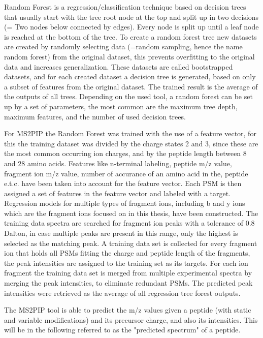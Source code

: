 \documentclass[11pt]{article}
\begin{document}
Random Forest \cite{random-forest} is a regression/classification technique based on decision trees that usually start with the tree root node at the top and split up in two decisions (= Two nodes below connected by edges). Every node is split up until a leaf node is reached at the bottom of the tree. To create a random forest tree new datasets are created by randomly selecting data (=random sampling, hence the name random forest) from the original dataset, this prevents overfitting to the original data and increases generalization. These datasets are called bootstrapped datasets, and for each created dataset a decision tree is generated, based on only a subset of features from the original dataset. The trained result is the average of the outputs of all trees. Depending on the used tool, a random forest can be set up by a set of parameters, the most common are the maximum tree depth, maximum features, and the number of used decision trees.

For MS2PIP the Random Forest was trained with the use of a feature vector, for this the training dataset was divided by the charge states 2 and 3, since these are the most common occurring ion charges, and by the peptide length between 8 and 28 amino acids. Features like n-terminal labeling, peptide m/z value, fragment ion m/z value, number of accurance of an amino acid in the, peptide e.t.c. have been taken into account for the feature vector. Each PSM is then assigned a set of features in the feature vector and labeled with a target. Regression models for multiple types of fragment ions, including b and y ions which are the fragment ions focused on in this thesis, have been constructed. The training data spectra are searched for fragment ion peaks with a tolerance of 0.8 Dalton, in case multiple peaks are present in this range, only the highest is selected as the matching peak. A training data set is collected for every fragment ion that holds all PSMs fitting the charge and peptide length of the fragments, the peak intensities are assigned to the training set as its targets. For each ion fragment the training data set is merged from multiple experimental spectra by merging the peak intensities, to eliminate redundant PSMs. 
The predicted peak intensities were retrieved as the average of all regression tree forest outputs.

The MS2PIP tool is able to predict the m/z values given a peptide (with static and variable modifications) and its precursor charge, and also its intensities. This will be in the following referred to as the "predicted spectrum" of a peptide.
\end{document}
